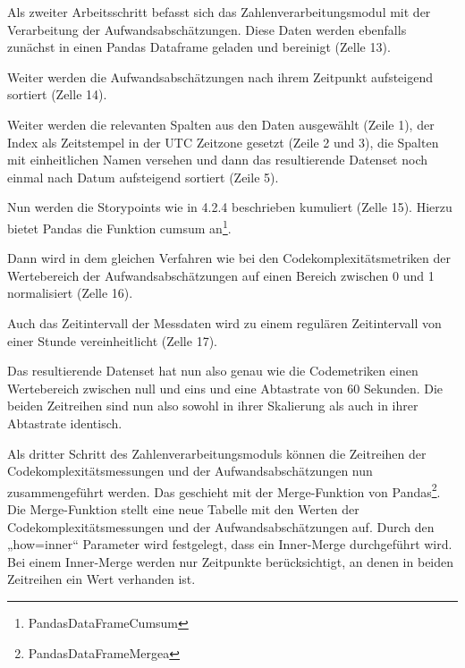 Als zweiter Arbeitsschritt befasst sich das Zahlenverarbeitungsmodul mit
der Verarbeitung der Aufwandsabschätzungen. Diese Daten werden ebenfalls
zunächst in einen Pandas Dataframe geladen und bereinigt (Zelle 13).

\lstset{style=pythonStyle}


Weiter werden die Aufwandsabschätzungen nach ihrem Zeitpunkt aufsteigend
sortiert (Zelle 14).

\lstset{style=pythonStyle}


Weiter werden die relevanten Spalten aus den Daten ausgewählt (Zeile 1),
der Index als Zeitstempel in der UTC Zeitzone gesetzt (Zeile 2 und 3),
die Spalten mit einheitlichen Namen versehen und dann das resultierende
Datenset noch einmal nach Datum aufsteigend sortiert (Zeile 5).

\lstset{style=pythonStyle}


Nun werden die Storypoints wie in 4.2.4 beschrieben kumuliert (Zelle
15). Hierzu bietet Pandas die Funktion cumsum an\footnote{PandasDataFrameCumsum}.

\lstset{style=pythonStyle}


Dann wird in dem gleichen Verfahren wie bei den Codekomplexitätsmetriken
der Wertebereich der Aufwandsabschätzungen auf einen Bereich zwischen 0
und 1 normalisiert (Zelle 16).

\lstset{style=pythonStyle}


Auch das Zeitintervall der Messdaten wird zu einem regulären
Zeitintervall von einer Stunde vereinheitlicht (Zelle 17).

\lstset{style=pythonStyle}


Das resultierende Datenset hat nun also genau wie die Codemetriken einen
Wertebereich zwischen null und eins und eine Abtastrate von 60 Sekunden.
Die beiden Zeitreihen sind nun also sowohl in ihrer Skalierung als auch
in ihrer Abtastrate identisch.

Als dritter Schritt des Zahlenverarbeitungsmoduls können die Zeitreihen
der Codekomplexitätsmessungen und der Aufwandsabschätzungen nun
zusammengeführt werden. Das geschieht mit der Merge-Funktion von
Pandas\footnote{PandasDataFrameMergea}. Die Merge-Funktion stellt eine
neue Tabelle mit den Werten der Codekomplexitätsmessungen und der
Aufwandsabschätzungen auf. Durch den „how=inner`` Parameter wird
festgelegt, dass ein Inner-Merge durchgeführt wird. Bei einem
Inner-Merge werden nur Zeitpunkte berücksichtigt, an denen in beiden
Zeitreihen ein Wert verhanden ist.


